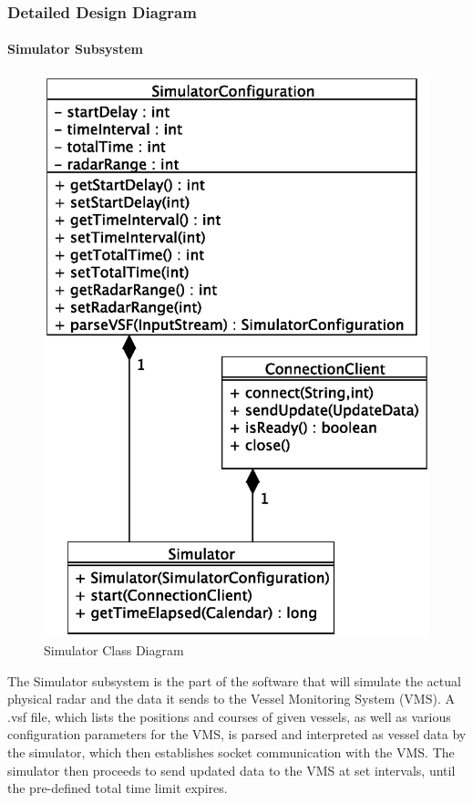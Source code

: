 \documentclass{article}
\begin{document}
\subsubsection{Detailed Design Diagram}

\paragraph{Simulator Subsystem}

\begin{figure}[h]
\caption{Simulator Class Diagram}
\includegraphics[width=\linewidth]{diagrams/simulator-class-diagram.eps}
\end{figure}

The Simulator subsystem is the part of the software that will simulate the actual physical radar and the data it sends to the Vessel Monitoring System (VMS). A .vsf file, which lists the positions and courses of given vessels, as well as various configuration parameters for the VMS, is parsed and interpreted as vessel data by the simulator, which then establishes socket communication with the VMS. The simulator then proceeds to send updated data to the VMS at set intervals, until the pre-defined total time limit expires.
\end{document}
